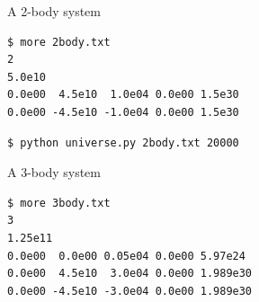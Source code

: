 \documentclass[8pt,a4paper,compress]{beamer}
\begin{document}
\begin{frame}[fragile]
\pause
\begin{minipage}{200pt}
A 2-body system
\begin{lstlisting}[language={}]
$ more 2body.txt
2 
5.0e10 
0.0e00  4.5e10  1.0e04 0.0e00 1.5e30 
0.0e00 -4.5e10 -1.0e04 0.0e00 1.5e30 
\end{lstlisting}

\begin{lstlisting}[language={}]
$ python universe.py 2body.txt 20000
\end{lstlisting}
\end{minipage}%
\hfill
\begin{minipage}{100pt}
\begin{center}
\end{center}
\end{minipage}

\pause
\smallskip

\begin{minipage}{200pt}
A 3-body system
\begin{lstlisting}[language={}]
$ more 3body.txt
3 
1.25e11 
0.0e00  0.0e00 0.05e04 0.0e00 5.97e24 
0.0e00  4.5e10  3.0e04 0.0e00 1.989e30 
0.0e00 -4.5e10 -3.0e04 0.0e00 1.989e30 
\end{lstlisting}


\end{minipage}
\end{frame}
\end{document}

